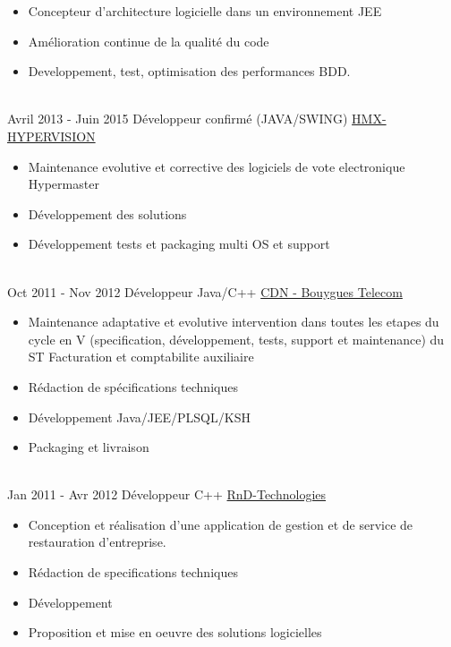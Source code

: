 \documentclass[letterpaper]{twentysecondcv} %
\begin{document}
\begin{twenty}
{{\begin{itemize}
     		\item Concepteur d'architecture logicielle dans un environnement JEE
     		\item Amélioration continue de la qualité du code
     		\item Developpement, test, optimisation des performances BDD.
    	\end{itemize}}
        }
     \\
     \twentyitem
   		{Avril 2013 -}
		{Juin 2015}
        {Développeur confirmé (JAVA/SWING)}
        {\href{}{HMX-HYPERVISION}}
        {}
        {
        \begin{itemize}
        	\item Maintenance evolutive et corrective des logiciels de vote electronique Hypermaster
        	\item Développement des solutions
        	\item Développement tests et packaging multi OS et support
    	\end{itemize}
    	}
        
       \\
    \twentyitem
    {Oct 2011 -}
    {Nov 2012}
    {Développeur Java/C++}
    {\href{https://www.jobs.bouyguestelecom.fr/}{CDN - Bouygues Telecom}}
    {}
    {
        \begin{itemize}
        	\item Maintenance adaptative et evolutive intervention dans toutes les etapes du cycle en V (specification, développement, tests, support et maintenance) du ST Facturation et comptabilite auxiliaire
        	\item Rédaction de spécifications techniques
        	\item Développement Java/JEE/PLSQL/KSH
        	\item Packaging et livraison	
        \end{itemize}
    }
    
           \\
    \twentyitem
    {Jan 2011 -}
    {Avr 2012}
    {Développeur C++}
    {\href{}{RnD-Technologies}}
    {}
    {
    	\begin{itemize}
		\item Conception et réalisation d'une application de gestion et de service de restauration d'entreprise.
		\item Rédaction de specifications techniques
		\item Développement
		\item Proposition et mise en oeuvre des solutions logicielles	
    	\end{itemize}
    }


\end{twenty}
\end{document}
